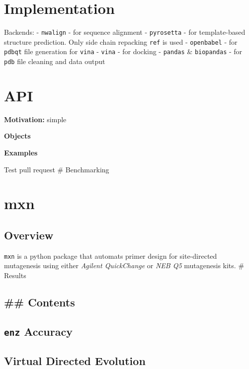 \hypertarget{implementation}{%
\section{Implementation}\label{implementation}}

Backends: - \texttt{nwalign} - for sequence alignment -
\texttt{pyrosetta} - for template-based structure prediction. Only side
chain repacking \texttt{ref} is used - \texttt{openbabel} - for
\texttt{pdbqt} file generation for \texttt{vina} - \texttt{vina} - for
docking - \texttt{pandas} \& \texttt{biopandas} - for \texttt{pdb} file
cleaning and data output

\hypertarget{api}{%
\section{API}\label{api}}

\textbf{Motivation:} simple

\textbf{Objects}

\textbf{Examples}

Test pull request \# Benchmarking

\hypertarget{mxn}{%
\section{mxn}\label{mxn}}

\hypertarget{overview-7}{%
\subsection{Overview}\label{overview-7}}

\texttt{mxn} is a python package that automats primer design for
site-directed mutagenesis using either \emph{Agilent QuickChange} or
\emph{NEB Q5} mutagenesis kits. \# Results

\hypertarget{contents-14}{%
\subsection{\#\# Contents}\label{contents-14}}

\hypertarget{enz-accuracy}{%
\subsection{\texorpdfstring{\texttt{enz}
Accuracy}{enz Accuracy}}\label{enz-accuracy}}

\hypertarget{virtual-directed-evolution}{%
\subsection{Virtual Directed
Evolution}\label{virtual-directed-evolution}}

